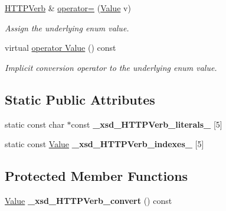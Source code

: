 \begin{DoxyCompactItemize}
\hyperlink{classopenstack_1_1xml_1_1HTTPVerb}{HTTPVerb} \& \hyperlink{classopenstack_1_1xml_1_1HTTPVerb_ab8d9fb81bc870c704c3e3a8f21fab560}{operator=} (\hyperlink{classopenstack_1_1xml_1_1HTTPVerb_a04bf58bd0d545f256c97c10787853217}{Value} v)
\begin{DoxyCompactList}\small\item\em Assign the underlying enum value. \item\end{DoxyCompactList}\item 
virtual \hyperlink{classopenstack_1_1xml_1_1HTTPVerb_aeb4024837d51e57c5015d9fbcbede61b}{operator Value} () const 
\begin{DoxyCompactList}\small\item\em Implicit conversion operator to the underlying enum value. \item\end{DoxyCompactList}\end{DoxyCompactItemize}
\subsection*{Static Public Attributes}
\begin{DoxyCompactItemize}
\item 
\hypertarget{classopenstack_1_1xml_1_1HTTPVerb_a859295454ac21ffe478282bfe362b3b0}{
static const char $\ast$const {\bfseries \_\-xsd\_\-HTTPVerb\_\-literals\_\-} \mbox{[}5\mbox{]}}
\label{classopenstack_1_1xml_1_1HTTPVerb_a859295454ac21ffe478282bfe362b3b0}

\item 
\hypertarget{classopenstack_1_1xml_1_1HTTPVerb_a35f79d2bd9ea847534743824276a4205}{
static const \hyperlink{classopenstack_1_1xml_1_1HTTPVerb_a04bf58bd0d545f256c97c10787853217}{Value} {\bfseries \_\-xsd\_\-HTTPVerb\_\-indexes\_\-} \mbox{[}5\mbox{]}}
\label{classopenstack_1_1xml_1_1HTTPVerb_a35f79d2bd9ea847534743824276a4205}

\end{DoxyCompactItemize}
\subsection*{Protected Member Functions}
\begin{DoxyCompactItemize}
\item 
\hypertarget{classopenstack_1_1xml_1_1HTTPVerb_a77e2a616edfc1e7ea1a0075068107318}{
\hyperlink{classopenstack_1_1xml_1_1HTTPVerb_a04bf58bd0d545f256c97c10787853217}{Value} {\bfseries \_\-xsd\_\-HTTPVerb\_\-convert} () const }
\label{classopenstack_1_1xml_1_1HTTPVerb_a77e2a616edfc1e7ea1a0075068107318}

\end{DoxyCompactItemize}



